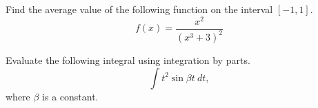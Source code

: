 \documentclass[12pt]{exam}
\begin{document}
\begin{questions}
\vfill
\droptotalpoints
\newpage

\question[10] Find the average value of the following function on the interval \([-1,1]\). 
\[
f(x)=\dfrac{x^2}{(x^3+3)^2}
\] 
\vfill
\droptotalpoints
\newpage

\question[15] Evaluate the following integral using integration by parts.
\[
\int t^2 \sin {\beta t}~dt,
\] where \(\beta \) is a constant. 
\vfill
\droptotalpoints






\end{questions}
\end{document}
